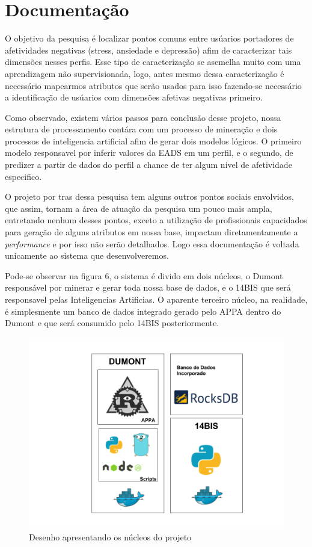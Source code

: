 \chapter{Documentação}
O objetivo da pesquisa é localizar pontos comuns entre usúarios portadores de afetividades negativas (stress, ansiedade e depressão) afim de caracterizar tais dimensões nesses perfis. Esse tipo de caracterização se asemelha muito com uma aprendizagem não supervisionada, logo, antes mesmo dessa caracterização é necessário mapearmos atributos que serão usados para isso fazendo-se necessário a identificação de usúarios com dimensões afetivas negativas primeiro.

Como observado, existem vários passos para conclusão desse projeto, nossa estrutura de processamento contára com um processo de mineração e dois processos de inteligencia artificial afim de gerar dois modelos lógicos. O primeiro modelo responsavel por inferir valores da EADS em um perfil, e o segundo, de predizer a partir de dados do perfil a chance de ter algum nivel de afetividade especifico.

O projeto por tras dessa pesquisa tem alguns outros pontos sociais envolvidos, que assim, tornam a área de atuação da pesquisa um pouco mais ampla, entretando nenhum desses pontos, exceto a utilização de profissionais capacidados para geração de alguns atributos em nossa base, impactam diretamentamente a \textit{performance} e por isso não serão detalhados. Logo essa documentação é voltada unicamente ao sistema que desenvolveremos.

Pode-se observar na figura 6, o sistema é divido em dois núcleos, o Dumont responsável por minerar e gerar toda nossa base de dados, e o 14BIS que será responsavel pelas Inteligencias Artificias. O aparente terceiro núcleo, na realidade, é simplesmente um banco de dados integrado gerado pelo APPA dentro do Dumont e que será consumido pelo 14BIS posteriormente.

\begin{figure}[H]
    \centering
    \includegraphics[width=.8\textwidth]{imagens/tecnologias.png}
    \caption{Desenho apresentando os núcleos do projeto}
    \label{fig:tecnologias}
\end{figure}

